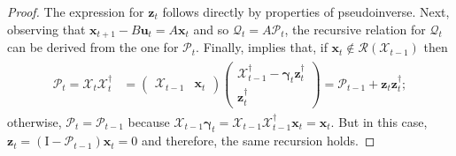 \documentclass[journal]{IEEEtran}
\theoremstyle{definition}
\theoremstyle{remark}
\newcommand\x{{\bm x}}
\def\u{{\bm u}}
\newcommand\z{{\bm z}}
\newcommand\ogamma{{\bm \gamma}}
\begin{document}
\begin{proof}
    The expression for $\z_t$ follows directly by properties of pseudoinverse.
    Next, observing that $\x_{t+1} - B\u_t = A \x_t$ and so $\mathcal{Q}_t = A\mathcal{P}_t$, the recursive relation for $\mathcal{Q}_t$ can be derived from the one for $\mathcal{P}_t$.
    Finally,  implies that, if $\x_t\not\in\mathcal{R}(\mathcal{X}_{t-1})$ then
    \begin{gather*}
        \begin{aligned}
            \mathcal{P}_t = \mathcal{X}_t \mathcal{X}_t^\dagger &= \left(\begin{array}{cc}
                \mathcal{X}_{t-1} & \x_t
            \end{array}\right) \left(\begin{array}{c}
    			\mathcal{X}_{t-1}^\dagger - \ogamma_t \z_t^\dagger \\ \z_t^\dagger
    		\end{array}\right) = \mathcal{P}_{t-1} + \z_t \z_t^\dagger;
        \end{aligned}
    \end{gather*}
    otherwise, $\mathcal{P}_{t} = \mathcal{P}_{t-1}$ because $\mathcal{X}_{t-1} \ogamma_t = \mathcal{X}_{t-1} \mathcal{X}_{t-1}^\dagger \x_t = \x_t$.
    But in this case,  $\z_t=(\mathrm{I}-\mathcal{P}_{t-1})\x_t=0$ and therefore, the same recursion holds.
\end{proof}
\end{document}

